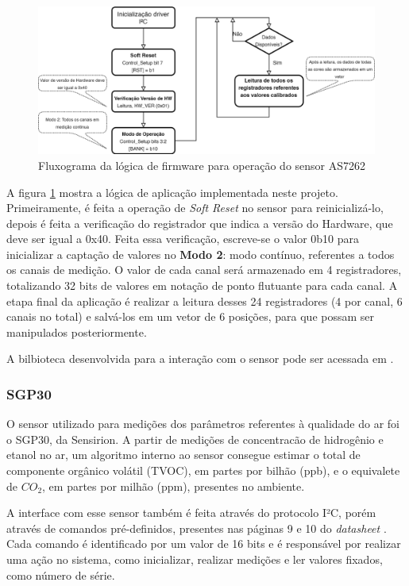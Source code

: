 \documentclass[../monografia.tex]{subfiles}
\begin{document}
\begin{figure}[h]
	\centering
	\includegraphics[scale=0.2]{as7262_firmware.png}
	\caption{Fluxograma da lógica de firmware para operação do sensor AS7262}
	\label{fig:as7262_firmware}
\end{figure}

A figura \ref{fig:as7262_firmware} mostra a lógica de aplicação implementada neste projeto. Primeiramente, é feita a operação de \textit{Soft Reset} no sensor para reinicializá-lo, depois é feita a verificação do registrador que indica a versão do Hardware, que deve ser igual a 0x40. Feita essa verificação, escreve-se o valor 0b10 para inicializar a captação de valores no \textbf{Modo 2}: modo contínuo, referentes a todos os canais de medição. O valor de cada canal será armazenado em 4 registradores, totalizando 32 bits de valores em notação de ponto flutuante para cada canal. A etapa final da aplicação é realizar a leitura desses 24 registradores (4 por canal, 6 canais no total) e salvá-los em um vetor de 6 posições, para que possam ser manipulados posteriormente.

A bilbioteca desenvolvida para a interação com o sensor pode ser acessada em \cite{as7262-lib}.



\subsubsection{SGP30}

O sensor utilizado para medições dos parâmetros referentes à qualidade do ar foi o SGP30, da Sensirion. A partir de medições de concentracão de hidrogênio e etanol no ar, um algoritmo interno ao sensor consegue estimar o total de componente orgânico volátil (TVOC), em partes por bilhão (ppb), e o equivalete de $CO_{2}$, em partes por milhão (ppm), presentes no ambiente. 

A interface com esse sensor também é feita através do protocolo I²C, porém através de comandos pré-definidos, presentes nas páginas 9 e 10 do \textit{datasheet} \cite{sgp30}. Cada comando é identificado por um valor de 16 bits e é responsável por realizar uma ação no sistema, como inicializar, realizar medições e ler valores fixados, como número de série. 
\end{document}
